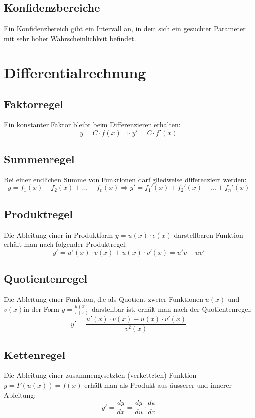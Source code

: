 \documentclass[10pt,a4paper,twocolumn]{article}
\begin{document}
\subsection{Konfidenzbereiche}
Ein Konfidenzbereich gibt ein Intervall an, in dem sich ein gesuchter Parameter mit sehr hoher Wahrscheinlichkeit befindet.




\section{Differentialrechnung}

\subsection{Faktorregel}
Ein konstanter Faktor bleibt beim Differenzieren erhalten:
\[
y=C\cdot f(x)\Rightarrow y'=C\cdot f'(x)
\]

\subsection{Summenregel}
Bei einer endlichen Summe von Funktionen darf gliedweise differenziert werden:
\[
y=f_1(x)+f_2(x)+...+f_n(x)\Rightarrow y'=f_1'(x)+f_2'(x)+...+f_n'(x)
\]

\subsection{Produktregel}
Die Ableitung einer in Produktform $y=u(x)\cdot v(x)$ darstellbaren Funktion erhält man nach folgender Produktregel:
\[
y'=u'(x)\cdot v(x)+u(x)\cdot v'(x)=u'v+uv'
\]

\subsection{Quotientenregel}
Die Ableitung einer Funktion, die als Quotient zweier Funktionen $u(x)$ und $v(x)$in der Form $y=\frac{u(x)}{v(x)}$ darstellbar ist, erhält man nach der Quotientenregel:
\[
y'=\frac{u'(x)\cdot v(x)-u(x)\cdot v'(x)}{v^2(x)}
\]

\subsection{Kettenregel}
Die Ableitung einer zusammengesetzten (verketteten) Funktion $y=F(u(x))=f(x)$ erhält man als Produkt aus äusserer und innerer Ableitung:
\[
y'=\frac{dy}{dx}=\frac{dy}{du}\cdot \frac{du}{dx}
\]
\end{document}
